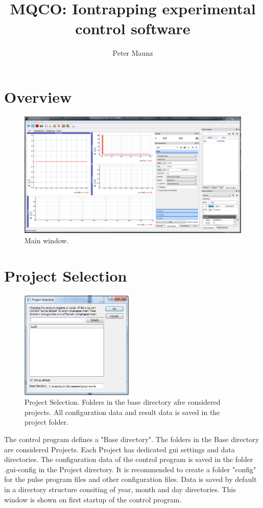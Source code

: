 \documentclass{scrartcl}
\author{Peter Maunz}
\title{MQCO: Iontrapping experimental control software}
\begin{document}
\maketitle

\section{Overview}

\begin{figure}[htbp]
\begin{center}
\includegraphics[width=\textwidth]{MainWindow}
\end{center}
\caption{\label{MainWindow} Main window.}
\end{figure}

\section{Project Selection}

\begin{figure}
\centering
\includegraphics[width=0.48\textwidth]{ProjectSelection}
\caption{\label{ProjectSelection} Project Selection. Folders in the base directory afre considered projects. All configuration data and result data is saved in the project folder.}
\end{figure}
The control program defines a "Base directory". The folders in the Base directory are considered Projects. Each Project has dedicated gui settings and data directories. The configuration data of the control program is saved in the folder .gui-config in the Project directory. It is recommended to create a folder "config" for the pulse program files and other configuration files. Data is saved by default in a directory structure consiting of year, month and day directories. This window is shown on first startup of the control program.
\end{document}
